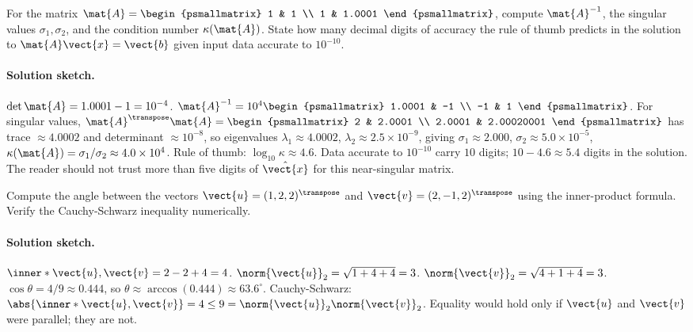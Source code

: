 \begin{exercise}
For the matrix $\mat{A} = \begin{psmallmatrix} 1 & 1 \\ 1 & 1.0001
\end{psmallmatrix}$, compute $\mat{A}^{-1}$, the singular values
$\sigma_{1}, \sigma_{2}$, and the condition number $\kappa(\mat{A})$.
State how many decimal digits of accuracy the rule of thumb predicts
in the solution to $\mat{A}\vect{x} = \vect{b}$ given input data
accurate to $10^{-10}$.
\end{exercise}

\paragraph{Solution sketch.}
$\det \mat{A} = 1.0001 - 1 = 10^{-4}$. $\mat{A}^{-1} = 10^{4}
\begin{psmallmatrix} 1.0001 & -1 \\ -1 & 1 \end{psmallmatrix}$.
For singular values, $\mat{A}^{\transpose}\mat{A} = \begin{psmallmatrix}
2 & 2.0001 \\ 2.0001 & 2.00020001 \end{psmallmatrix}$ has trace
$\approx 4.0002$ and determinant $\approx 10^{-8}$, so eigenvalues
$\lambda_{1} \approx 4.0002$, $\lambda_{2} \approx 2.5 \times
10^{-9}$, giving $\sigma_{1} \approx 2.000$, $\sigma_{2} \approx
5.0 \times 10^{-5}$, $\kappa(\mat{A}) = \sigma_{1}/\sigma_{2}
\approx 4.0 \times 10^{4}$. Rule of thumb: $\log_{10}\kappa
\approx 4.6$. Data accurate to $10^{-10}$ carry $10$ digits;
$10 - 4.6 \approx 5.4$ digits in the solution. The reader should
not trust more than five digits of $\hat{\vect{x}}$ for this
near-singular matrix.

\begin{exercise}
Compute the angle between the vectors $\vect{u} = (1, 2, 2)^{\transpose}$
and $\vect{v} = (2, -1, 2)^{\transpose}$ using the inner-product
formula. Verify the Cauchy-Schwarz inequality numerically.
\end{exercise}

\paragraph{Solution sketch.}
$\inner*{\vect{u}, \vect{v}} = 2 - 2 + 4 = 4$. $\norm{\vect{u}}_{2}
= \sqrt{1 + 4 + 4} = 3$. $\norm{\vect{v}}_{2} = \sqrt{4 + 1 + 4}
= 3$. $\cos\theta = 4/9 \approx 0.444$, so $\theta \approx
\arccos(0.444) \approx 63.6^{\circ}$. Cauchy-Schwarz: $\abs{\inner*{
\vect{u}, \vect{v}}} = 4 \leq 9 = \norm{\vect{u}}_{2}
\norm{\vect{v}}_{2}$. Equality would hold only if $\vect{u}$ and
$\vect{v}$ were parallel; they are not.

